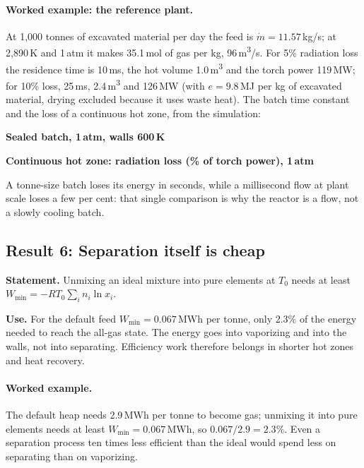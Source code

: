 \documentclass[11pt,a4paper]{article}
\begin{document}
\paragraph{Worked example: the reference plant.} At 1,000 tonnes of excavated material per day the feed is $\dot m = 11.57$\,kg/s; at 2,890\,K and 1\,atm it makes 35.1\,mol of gas per kg, 96\,m\textsuperscript{3}/s. For 5\% radiation loss the residence time is 10\,ms, the hot volume 1.0\,m\textsuperscript{3} and the torch power 119\,MW; for 10\% loss, 25\,ms, 2.4\,m\textsuperscript{3} and 126\,MW (with $e = 9.8$\,MJ per kg of excavated material, drying excluded because it uses waste heat). The batch time constant and the loss of a continuous hot zone, from the simulation:
\begin{center}
\begin{minipage}[t]{0.38\textwidth}\centering\textbf{Sealed batch, 1\,atm, walls 600\,K}\\[3pt]\end{minipage}\hfill
\begin{minipage}[t]{0.6\textwidth}\centering\textbf{Continuous hot zone: radiation loss (\% of torch power), 1\,atm}\\[3pt]\end{minipage}
\end{center}
A tonne-size batch loses its energy in seconds, while a millisecond flow at plant scale loses a few per cent: that single comparison is why the reactor is a flow, not a slowly cooling batch.

\subsection{Result 6: Separation itself is cheap}
\textbf{Statement.} Unmixing an ideal mixture into pure elements at $T_0$ needs at least $W_{\min} = -RT_0\sum_i n_i\ln x_i$.

\textbf{Use.} For the default feed $W_{\min} = 0.067$\,MWh per tonne, only 2.3\% of the energy needed to reach the all-gas state. The energy goes into vaporizing and into the walls, not into separating. Efficiency work therefore belongs in shorter hot zones and heat recovery.

\paragraph{Worked example.} The default heap needs 2.9\,MWh per tonne to become gas; unmixing it into pure elements needs at least $W_{\min} = 0.067$\,MWh, so $0.067/2.9 = 2.3\%$. Even a separation process ten times less efficient than the ideal would spend less on separating than on vaporizing.
\end{document}
